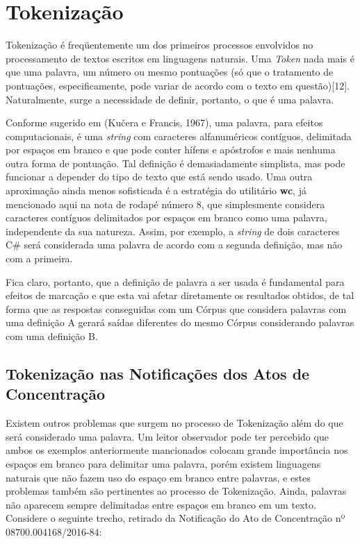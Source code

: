 \documentclass[11pt]{report}
\begin{document}
\section{Tokenização}

\indent\indent Tokenização é freqüentemente um dos primeiros processos envolvidos no processamento de textos escritos em linguagens naturais. Uma \textit{Token} nada mais é que uma
palavra, um número ou mesmo pontuações (só que o tratamento de pontuações, especificamente, pode variar de acordo com o texto em questão)[12]. Naturalmente, surge a necessidade de
definir, portanto, o que é uma palavra.

Conforme sugerido em (Kučera e Francis, 1967), uma palavra, para efeitos computacionais, é uma \textit{string} com caracteres alfanuméricos
contíguos, delimitada por espaços em branco e que pode conter hífens e apóstrofos e mais nenhuma outra forma de pontuação. Tal definição é demasiadamente simplista,
mas pode funcionar a depender do tipo de texto que está sendo usado. Uma outra aproximação ainda menos sofisticada é a estratégia do utilitário \textbf{wc}, já mencionado
aqui na nota de rodapé número 8, que simplesmente considera caracteres contíguos delimitados por espaços em branco como uma palavra, independente da sua natureza. Assim, por exemplo,
a \textit{string} de dois caracteres C\# será considerada uma palavra de acordo com a segunda definição, mas não com a primeira.

Fica claro, portanto, que a definição de palavra a ser usada é fundamental para efeitos de marcação e que esta vai afetar diretamente os resultados obtidos, de tal forma que as
respostas conseguidas com um Córpus que considera palavras com uma definição A gerará saídas diferentes do mesmo Córpus considerando palavras com uma definição B.

\subsection{Tokenização nas Notificações dos Atos de Concentração}

\indent\indent Existem outros problemas que surgem no processo de Tokenização além do que será considerado uma palavra. Um leitor observador pode ter percebido que ambos os exemplos anteriormente
mancionados colocam grande importância nos espaços em branco para delimitar uma palavra, porém existem linguagens naturais que não fazem uso do espaço em branco entre palavras, e
estes problemas também são pertinentes ao processo de Tokenização. Ainda, palavras não aparecem sempre delimitadas entre espaços em branco em um texto. Considere o seguinte trecho,
retirado da Notificação do Ato de Concentração nº 08700.004168/2016-84:
\end{document}
